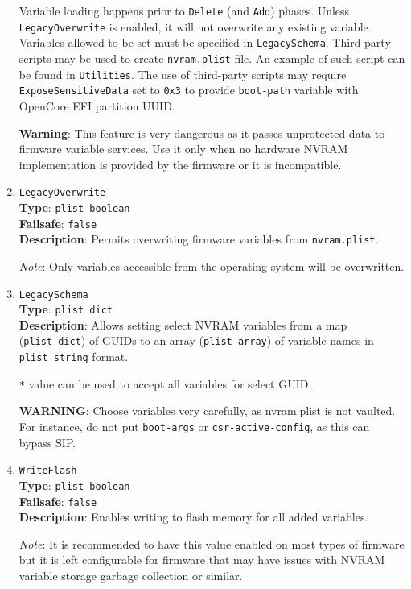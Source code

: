 \documentclass[]{article}
\begin{document}
\begin{enumerate}
  Variable loading happens prior to \texttt{Delete} (and \texttt{Add}) phases. Unless
  \texttt{LegacyOverwrite} is enabled, it will not overwrite any existing variable.
  Variables allowed to be set must be specified in \texttt{LegacySchema}.
  Third-party scripts may be used to create \texttt{nvram.plist}
  file. An example of such script can be found in \texttt{Utilities}. The use of third-party
  scripts may require \texttt{ExposeSensitiveData} set to \texttt{0x3} to provide
  \texttt{boot-path} variable with OpenCore EFI partition UUID.

  \textbf{Warning}: This feature is very dangerous as it passes unprotected data to
  firmware variable services. Use it only when no hardware NVRAM implementation is provided
  by the firmware or it is incompatible.

\item
  \texttt{LegacyOverwrite}\\
  \textbf{Type}: \texttt{plist\ boolean}\\
  \textbf{Failsafe}: \texttt{false}\\
  \textbf{Description}: Permits overwriting firmware variables from \texttt{nvram.plist}.

  \emph{Note}: Only variables accessible from the operating system will be overwritten.

\item
  \texttt{LegacySchema}\\
  \textbf{Type}: \texttt{plist\ dict}\\
  \textbf{Description}: Allows setting select NVRAM variables from a map
  (\texttt{plist\ dict}) of GUIDs to an array (\texttt{plist\ array}) of
  variable names in \texttt{plist\ string} format.

  \texttt{*} value can be used to accept all variables for select GUID.

  \textbf{WARNING}: Choose variables very carefully, as nvram.plist is not vaulted.
  For instance, do not put \texttt{boot-args} or \texttt{csr-active-config}, as
  this can bypass SIP.

\item
  \texttt{WriteFlash}\\
  \textbf{Type}: \texttt{plist\ boolean}\\
  \textbf{Failsafe}: \texttt{false}\\
  \textbf{Description}: Enables writing to flash memory for all added variables.

  \emph{Note}: It is recommended to have this value enabled on most types of firmware but it is
  left configurable for firmware that may have issues with NVRAM variable storage
  garbage collection or similar.

\end{enumerate}
\end{document}
